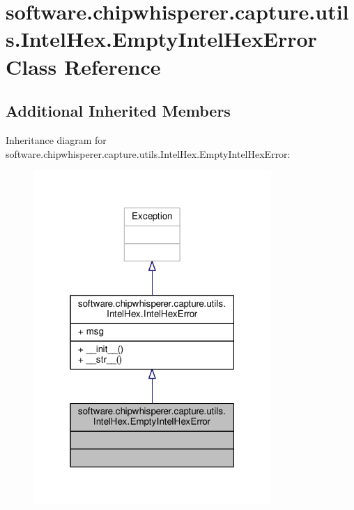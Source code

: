 \hypertarget{classsoftware_1_1chipwhisperer_1_1capture_1_1utils_1_1IntelHex_1_1EmptyIntelHexError}{}\section{software.\+chipwhisperer.\+capture.\+utils.\+Intel\+Hex.\+Empty\+Intel\+Hex\+Error Class Reference}
\label{classsoftware_1_1chipwhisperer_1_1capture_1_1utils_1_1IntelHex_1_1EmptyIntelHexError}
\subsection*{Additional Inherited Members}


Inheritance diagram for software.\+chipwhisperer.\+capture.\+utils.\+Intel\+Hex.\+Empty\+Intel\+Hex\+Error\+:\nopagebreak
\begin{figure}[H]
\begin{center}
\leavevmode
\includegraphics[width=256pt]{dd/d84/classsoftware_1_1chipwhisperer_1_1capture_1_1utils_1_1IntelHex_1_1EmptyIntelHexError__inherit__graph}
\end{center}
\end{figure}


